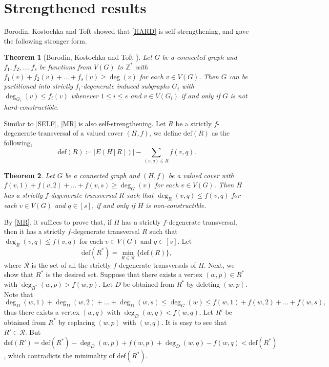 \documentclass{article}
\makeatletter
\renewenvironment{proof}[1][\proofname]{\par
  \pushQED{\qed}%
  \normalfont \topsep6\p@\@plus6\p@\relax
  \trivlist
  \item[\hskip\labelsep
        \bfseries
    #1\@addpunct{.}]\ignorespaces
}{%
  \popQED\endtrivlist\@endpefalse
}
\newtheorem{theorem}{Theorem}[section]
\theoremstyle{definition}
\makeatother
\begin{document}
\section{Strengthened results}\label{sec:SELF-STRENGTHENING}
Borodin, Kostochka and Toft \cite{MR1743629} showed that \autoref{HARD} is self-strengthening, and gave the following stronger form.
\begin{theorem}[Borodin, Kostochka and Toft \cite{MR1743629}]\label{SELF}
Let $G$ be a connected graph and $f_{1}, f_{2}, \dots, f_{s}$ be functions from $V(G)$ to $\mathbb{Z}^{*}$ with $f_{1}(v) + f_{2}(v) + \dots + f_{s}(v) \geq \deg(v)$ for each $v \in V(G)$. Then $G$ can be partitioned into strictly $f_{i}$-degenerate induced subgraphs $G_{i}$ with $\deg_{G_{i}}(v) \leq f_{i}(v)$ whenever $1 \leq i \leq s$ and $v \in V(G_{i})$ if and only if $G$ is not hard-constructible.  
\end{theorem}

Similar to \autoref{SELF}, \autoref{MR} is also self-strengthening. Let $R$ be a strictly $f$-degenerate transversal of a valued cover $(H, f)$, we define $\mathrm{def}(R)$ as the following, 
\begin{equation*}
\mathrm{def}(R) \coloneqq |E(H[R])| - \sum_{(v, q) \in R} f(v, q). 
\end{equation*}
\begin{theorem}\label{SMR}
Let $G$ be a connected graph and $(H, f)$ be a valued cover with $f(v, 1) + f(v, 2) + \dots + f(v, s) \geq \deg_{G}(v)$ for each $v \in V(G)$. Then $H$ has a strictly $f$-degenerate transversal $R$ such that $\deg_{R}(v, q) \leq f(v, q)$ for each $v \in V(G)$ and $q \in [s]$, if and only if $H$ is non-constructible. 
\end{theorem}
\begin{proof}
By \autoref{MR}, it suffices to prove that, if $H$ has a strictly $f$-degenerate transversal, then it has a strictly $f$-degenerate transversal $R$ such that $\deg_{R}(v, q) \leq f(v, q)$ for each $v \in V(G)$ and $q \in [s]$. Let 
\begin{equation*}
\mathrm{def}(R^{*}) = \min_{R \in \mathcal{R}} \big\{\mathrm{def}(R) \big\}, 
\end{equation*}
where $\mathcal{R}$ is the set of all the strictly $f$-degenerate transversals of $H$. Next, we show that $R^{*}$ is the desired set. Suppose that there exists a vertex $(w, p) \in R^{*}$ with $\deg_{R^{*}}(w, p) > f(w, p)$. Let $D$ be obtained from $R^{*}$ by deleting $(w, p)$. Note that 
\begin{equation*}
\deg_{D}(w, 1) + \deg_{D}(w, 2) + \dots + \deg_{D}(w, s) \leq \deg_{G}(w) \leq f(w, 1) + f(w, 2) + \dots + f(w, s), 
\end{equation*}
thus there exists a vertex $(w, q)$ with $\deg_{D}(w, q) < f(w, q)$. Let $R'$ be obtained from $R^{*}$ by replacing $(w, p)$ with $(w, q)$. It is easy to see that $R' \in \mathcal{R}$. But $\mathrm{def}(R') = \mathrm{def}(R^{*}) - \deg_{D}(w, p) + f(w, p) + \deg_{D}(w, q)  - f(w, q) < \mathrm{def}(R^{*})$, which contradicts the minimality of $\mathrm{def}(R^{*})$. 
\end{proof}
\end{document}
